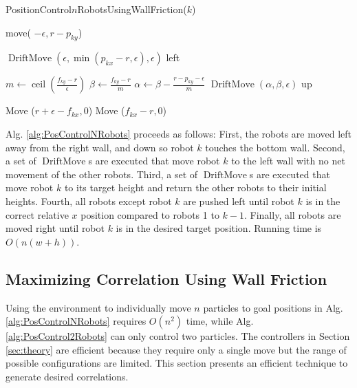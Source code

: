 \begin{algorithm}
\caption{PositionControl$n$RobotsUsingWallFriction($k$)}\label{alg:PosControlNRobots}
\begin{algorithmic}[1]
\State move( $-\epsilon, r-p_{ky}$) %


\State $\operatorname{DriftMove}(\epsilon, \min(p_{kx} - r,\epsilon), \epsilon)$ left   %
\EndWhile

\State $m \gets \operatorname{ceil}(\frac{f_{ky}-r}{\epsilon})$
\State $\beta \gets \frac{f_{ky}-r}{m}$
\State $\alpha \gets \beta - \frac{r - p_{ky}-\epsilon}{m}$
\State $\operatorname{DriftMove}(\alpha, \beta, \epsilon)$ up   %
\EndFor

\State Move ($r+\epsilon-f_{kx}, 0$)  %
\State Move ($f_{kx}-r, 0$)  

\end{algorithmic}
\end{algorithm}

Alg. \ref{alg:PosControlNRobots} proceeds as follows:  
First, the robots are moved left away from the right wall, and down so robot $k$ touches the bottom wall.
Second, a set of $\operatorname{DriftMove}$s are executed that move robot $k$ to the left wall with no net movement of the other robots.
Third, a set of $\operatorname{DriftMove}$s are executed that  move robot $k$ to its target height and return the other robots to their initial heights. 
Fourth, all robots except robot $k$ are pushed left until robot $k$ is in the correct relative $x$ position compared to robots 1 to $k-1$.
Finally, all robots are moved right until robot $k$ is in the desired target position. Running time is $O(n(w+h))$.



\subsection{Maximizing Correlation Using Wall Friction}\label{subsec:ClosedLoopCovarianceControl}
Using the environment to individually move $n$ particles to goal positions in Alg. \ref{alg:PosControlNRobots} requires $O(n^2)$ time, while  Alg. \ref{alg:PosControl2Robots} can only control two particles. The controllers in Section \ref{sec:theory} are efficient because they require only a single move but the range of possible configurations are limited. This section presents an efficient technique to generate desired correlations.

